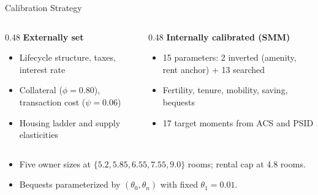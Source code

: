 \documentclass[11pt,aspectratio=169]{beamer}
\begin{document}
\begin{frame}{Calibration Strategy}
\label{app:calibration_strategy}
\footnotesize
\begin{columns}[T,onlytextwidth]
\begin{column}{0.48\textwidth}
\textbf{Externally set}
\begin{itemize}\setlength\itemsep{-1pt}
  \item Lifecycle structure, taxes, interest rate
  \item Collateral ($\phi=0.80$), transaction cost ($\psi=0.06$)
  \item Housing ladder and supply elasticities
\end{itemize}
\end{column}
\begin{column}{0.48\textwidth}
\textbf{Internally calibrated (SMM)}
\begin{itemize}\setlength\itemsep{-1pt}
  \item 15 parameters: 2 inverted (amenity, rent anchor) + 13 searched
  \item Fertility, tenure, mobility, saving, bequests
  \item 17 target moments from ACS and PSID
\end{itemize}
\end{column}
\end{columns}

\medskip
\begin{itemize}\setlength\itemsep{-1pt}
  \item Five owner sizes at $\{5.2, 5.85, 6.55, 7.55, 9.0\}$ rooms; rental cap at 4.8 rooms.
  \item Bequests parameterized by $(\theta_0,\theta_n)$ with fixed $\theta_1=0.01$.
\end{itemize}
\end{frame}

\end{document}
